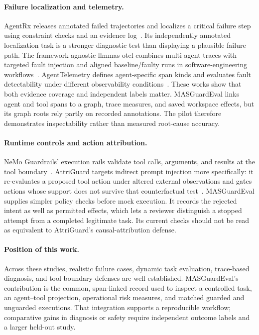 \paragraph{Failure localization and telemetry.}
AgentRx releases annotated failed trajectories and localizes a critical failure step using constraint checks and an evidence log~\cite{barke2026agentrx}. Its independently annotated localization task is a stronger diagnostic test than displaying a plausible failure path. The framework-agnostic llmmas-otel combines multi-agent traces with targeted fault injection and aligned baseline/faulty runs in software-engineering workflows~\cite{seyedghorban2026observability}. AgentTelemetry defines agent-specific span kinds and evaluates fault detectability under different observability conditions~\cite{balusu2026agenttelemetry}. These works show that both evidence coverage and independent labels matter. MASGuardEval links agent and tool spans to a graph, trace measures, and saved workspace effects, but its graph roots rely partly on recorded annotations. The pilot therefore demonstrates inspectability rather than measured root-cause accuracy.

\paragraph{Runtime controls and action attribution.}
NeMo Guardrails' execution rails validate tool calls, arguments, and results at the tool boundary~\cite{nvidia2026rails}. AttriGuard targets indirect prompt injection more specifically: it re-evaluates a proposed tool action under altered external observations and gates actions whose support does not survive that counterfactual test~\cite{he2026attriguard}. MASGuardEval supplies simpler policy checks before mock execution. It records the rejected intent as well as permitted effects, which lets a reviewer distinguish a stopped attempt from a completed legitimate task. Its current checks should not be read as equivalent to AttriGuard's causal-attribution defense.

\paragraph{Position of this work.}
Across these studies, realistic failure cases, dynamic task evaluation, trace-based diagnosis, and tool-boundary defenses are well established. MASGuardEval's contribution is the common, span-linked record used to inspect a controlled task, an agent--tool projection, operational risk measures, and matched guarded and unguarded executions. That integration supports a reproducible workflow; comparative gains in diagnosis or safety require independent outcome labels and a larger held-out study.

